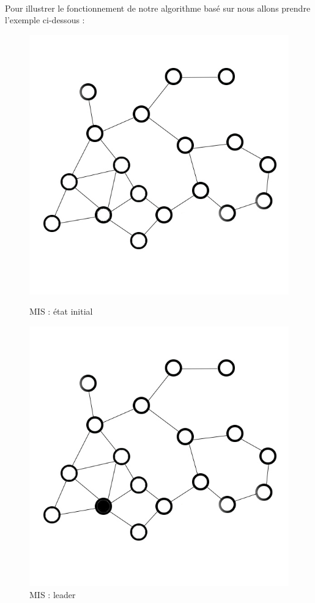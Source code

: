 \paragraph{}
Pour illustrer le fonctionnement de notre algorithme basé sur \cite{cardei2002connected} nous allons prendre l'exemple ci-dessous :
\begin{figure}
    \begin{minipage}[c]{.46\linewidth}
        \includegraphics{images/mis1.jpg}
        \caption{MIS : état initial}
        \label{mis1}
    \end{minipage} \hfill
    \begin{minipage}[c]{.46\linewidth}
        \includegraphics{images/mis2.jpg}
    \caption{MIS : leader}
    \label{mis2}
    \end{minipage}
\end{figure}

